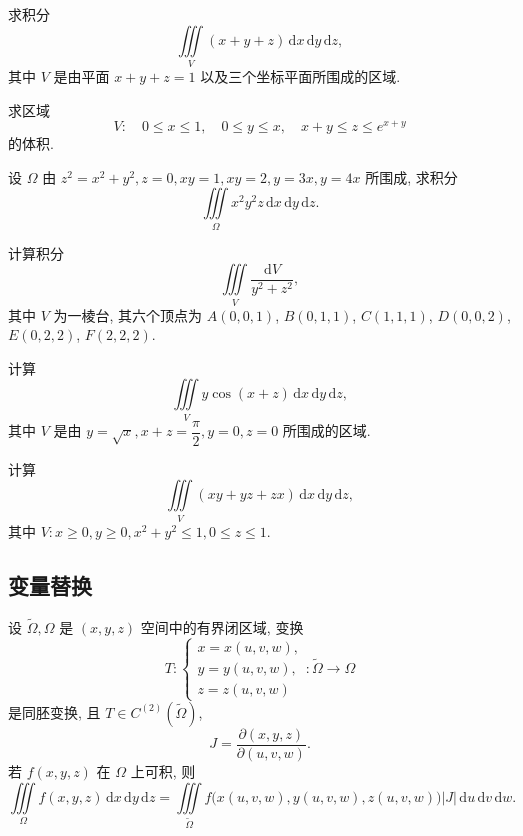 \documentclass[../数学分析培优讲义.tex]{subfiles}
\begin{document}
\begin{example}
求积分
\[
    \iiint\limits_V(x+y+z)\,\mathrm{d}x\,\mathrm{d}y\,\mathrm{d}z,
\]
其中 $V$ 是由平面 $x+y+z=1$ 以及三个坐标平面所围成的区域.
\end{example}
\exampleblank

\begin{example}
求区域
\[
    V:\quad0\leq x\leq1,\quad0\leq y\leq x,\quad x+y\leq z\leq e^{x+y}
\]
的体积.
\end{example}
\exampleblank

\begin{example}
设 $\Omega$ 由 $z^2=x^2+y^2,z=0,xy=1,xy=2,y=3x,y=4x$ 所围成, 求积分
\[
    \iiint\limits_\Omega x^2y^2z\,\mathrm{d}x\,\mathrm{d}y\,\mathrm{d}z.
\]
\end{example}
\exampleblank

\begin{example}
计算积分
\[
    \iiint\limits_V\dfrac{\mathrm{d}V}{y^2+z^2},
\]
其中 $V$ 为一棱台, 其六个顶点为 $A(0,0,1)$, $B(0,1,1)$, $C(1,1,1)$, $D(0,0,2)$, $E(0,2,2)$, $F(2,2,2)$.
\end{example}
\exampleblank

\begin{example}
计算
\[
    \iiint\limits_V y\cos(x+z)\,\mathrm{d}x\,\mathrm{d}y\,\mathrm{d}z,
\]
其中 $V$ 是由 $y=\sqrt{x},x+z=\dfrac{\pi}{2},y=0,z=0$ 所围成的区域.
\end{example}
\exampleblank

\begin{example}
计算
\[
    \iiint\limits_V(xy+yz+zx)\,\mathrm{d}x\,\mathrm{d}y\,\mathrm{d}z,
\]
其中 $V:x\geq0,y\geq0,x^2+y^2\leq1,0\leq z\leq1$.
\end{example}
\exampleblank


\newpage

\subsection{变量替换}

\begin{theorem}[\markstar]
设 $\widetilde\Omega,\Omega$ 是 $(x,y,z)$ 空间中的有界闭区域, 变换
\[
    T:\begin{cases}
        x=x(u,v,w),\\
        y=y(u,v,w),\\
        z=z(u,v,w)
    \end{cases}
    :\widetilde\Omega\to\Omega
\]
是同胚变换, 且 $T\in C^{(2)}(\widetilde\Omega)$,
\[
    J=\dfrac{\partial(x,y,z)}{\partial(u,v,w)}.
\]
若 $f(x,y,z)$ 在 $\Omega$ 上可积, 则
\[
    \iiint\limits_\Omega f(x,y,z)\,\mathrm{d}x\,\mathrm{d}y\,\mathrm{d}z
    =\iiint\limits_{\widetilde\Omega}
    f\bigl(x(u,v,w),y(u,v,w),z(u,v,w)\bigr)|J|\,\mathrm{d}u\,\mathrm{d}v\,\mathrm{d}w.
\]
\end{theorem}
\end{document}
